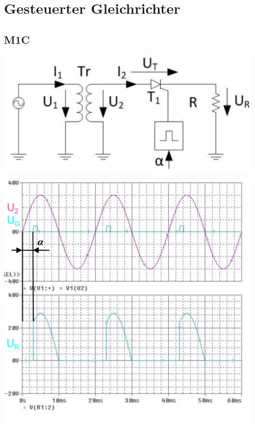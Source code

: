 \section{Gesteuerter Gleichrichter}
\subsection{M1C}
\vspace{-0.5cm}
\begin{minipage}{0.4\linewidth}
    \includegraphics[width=0.8\linewidth]{images/GRM1c}
\end{minipage}
\begin{minipage}{0.35\linewidth}
    \centering %
    \includegraphics[width=0.8\linewidth]{images/M1CKl}

\end{minipage}
